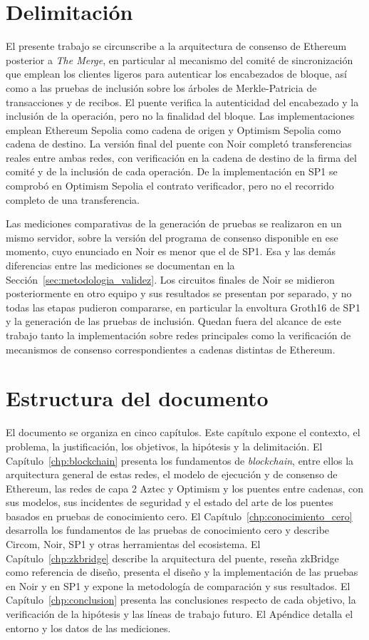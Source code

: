 \section{Delimitación}

El presente trabajo se circunscribe a la arquitectura de consenso de Ethereum posterior a
\textit{The Merge}, en particular al mecanismo del comité de sincronización que emplean los
clientes ligeros para autenticar los encabezados de bloque, así como a las pruebas de inclusión
sobre los árboles de Merkle-Patricia de transacciones y de recibos. El puente verifica la
autenticidad del encabezado y la inclusión de la operación, pero no la finalidad del bloque. Las
implementaciones emplean Ethereum Sepolia como cadena de origen y Optimism Sepolia como cadena de
destino. La versión final del puente con Noir completó transferencias reales entre ambas redes,
con verificación en la cadena de destino de la firma del comité y de la inclusión de cada
operación. De la implementación en SP1 se comprobó en Optimism Sepolia el contrato verificador,
pero no el recorrido completo de una transferencia.

Las mediciones comparativas de la generación de pruebas se realizaron en un mismo servidor, sobre
la versión del programa de consenso disponible en ese momento, cuyo enunciado en Noir es menor que
el de SP1. Esa y las demás diferencias entre las mediciones se documentan en la
Sección~\ref{sec:metodologia_validez}. Los circuitos finales de Noir se midieron posteriormente en
otro equipo y sus resultados se presentan por separado, y no todas las etapas pudieron compararse,
en particular la envoltura Groth16 de SP1 y la generación de las pruebas de inclusión. Quedan fuera del alcance de este trabajo tanto la implementación sobre
redes principales como la verificación de mecanismos de consenso correspondientes a cadenas
distintas de Ethereum.


\section{Estructura del documento}

El documento se organiza en cinco capítulos. Este capítulo expone el contexto, el problema,
la justificación, los objetivos, la hipótesis y la delimitación. El
Capítulo~\ref{chp:blockchain} presenta los fundamentos de \textit{blockchain}, entre ellos
la arquitectura general de estas redes, el modelo de ejecución y de consenso de Ethereum, las
redes de capa 2 Aztec y Optimism y los puentes entre cadenas, con sus modelos, sus incidentes de
seguridad y el estado del arte de los puentes basados en pruebas de conocimiento cero. El
Capítulo~\ref{chp:conocimiento_cero} desarrolla los fundamentos de las pruebas de conocimiento
cero y describe Circom, Noir, SP1 y otras herramientas del ecosistema. El
Capítulo~\ref{chp:zkbridge} describe la arquitectura del puente, reseña zkBridge como referencia
de diseño, presenta el diseño y la implementación de las pruebas en Noir y en SP1 y expone la
metodología de comparación y sus resultados. El Capítulo~\ref{chp:conclusion} presenta las
conclusiones respecto de cada objetivo, la verificación de la hipótesis y las líneas de trabajo
futuro. El Apéndice detalla el entorno y los datos de las
mediciones.
